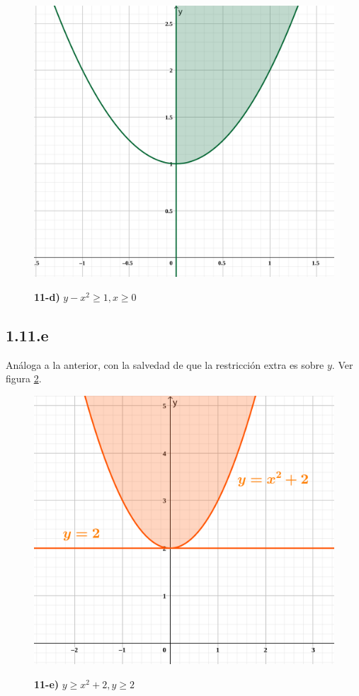 \documentclass{article}
\begin{document}
\begin{figure}[ht]
\caption{\textbf{11-d)} $y - x^2 \geq 1, x \geq 0$}
\includegraphics[scale=1.75]{../img/exercises/guide_01/11_d.png} 
\centering
\label{fig:1-11-d}
\end{figure}

\subsection*{1.11.e}
\label{subsec:1.11.e}

Análoga a la anterior, con la salvedad de que la restricción extra es sobre $y$. Ver figura \ref{fig:1-11-e}.

\begin{figure}[ht]
\caption{\textbf{11-e)} $y \geq x^2 + 2, y \geq 2$}
\includegraphics[scale=1.0]{../img/exercises/guide_01/11_e.png} 
\centering
\label{fig:1-11-e}
\end{figure}
\end{document}
